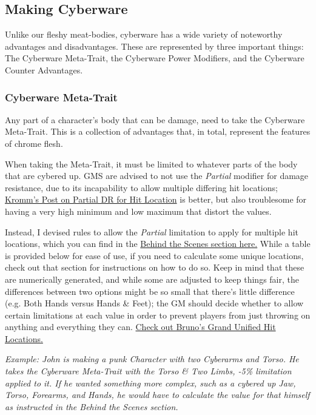 \begin{multicols*}{3}
	\subsection{Making Cyberware}
	
	Unlike our fleshy meat-bodies, cyberware has a wide variety of noteworthy advantages and disadvantages. These are represented by three important things: The Cyberware Meta-Trait, the Cyberware Power Modifiers, and the Cyberware Counter Advantages.
	
	\subsubsection{Cyberware Meta-Trait}\label{cyberware-meta-trait}
	
	Any part of a character's body that can be damage, need to take the Cyberware Meta-Trait. This is a collection of advantages that, in total, represent the features of chrome flesh.
	
	When taking the Meta-Trait, it must be limited to whatever parts of the body that are cybered up. GMS are advised to not use the \textit{Partial} modifier for damage resistance, due to its incapability to allow multiple differing hit locations; \textcolor{Blue}{\href{http://forums.sjgames.com/showpost.php?p=623207&postcount=1}{Kromm's Post on Partial DR for Hit Location}} is better, but also troublesome for having a very high minimum and low maximum that distort the values.
	
	Instead, I devised rules to allow the \textit{Partial} limitation to apply for multiple hit locations, which you can find in the \hyperref[partial]{Behind the Scenes section here.} While a table is provided below for ease of use, if you need to calculate some unique locations, check out that section for instructions on how to do so. Keep in mind that these are numerically generated, and while some are adjusted to keep things fair, the differences between two options might be so small that there's little difference (e.g. Both Hands versus Hands \& Feet); the GM should decide whether to allow certain limitations at each value in order to prevent players from just throwing on anything and everything they can. \textcolor{Blue}{\href{https://drive.google.com/file/d/0B9vo3aBTs2W7UExsUEZGNjdJejg/view?resourcekey=0-pGjkVxQLp-67-iHB73z1dQ}{Check out Bruno's Grand Unified Hit Locations.}}
	
	\textcolor{OliveGreen}{\textit{Example: John is making a punk Character with two Cyberarms and Torso. He takes the Cyberware Meta-Trait with the \textit{Torso \& Two Limbs, -5\%} limitation applied to it. If he wanted something more complex, such as a cybered up Jaw, Torso, Forearms, and Hands, he would have to calculate the value for that himself as instructed in the Behind the Scenes section.}}
	

\end{multicols*}
